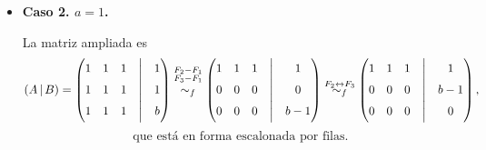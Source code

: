 \documentclass[a4paper,12pt]{article}
\begin{document}
\begin{ejercicio}[title=Ejercicio 31]
\begin{itemize}
Entonces, la solución ${X} = {A}^{-1} {B}$ es:

\[
\begin{pmatrix}
x\\
y\\
z
\end{pmatrix}
= \frac{1}{a^2+a-2}
\begin{pmatrix}
a+1 & -1 & -1\\
-1 & a+1 & -1\\
-1 & -1 & a+1
\end{pmatrix}
\begin{pmatrix}
1\\
1\\
b
\end{pmatrix}
\]

\[
= \frac{1}{a^2+a-2}
\begin{pmatrix}
(a+1) - 1 - b\\
-1 + (a+1) - b\\
-1 - 1 + b(a+1)
\end{pmatrix}
= \frac{1}{a^2+a-2}
\begin{pmatrix}
a-b\\
a-b\\
ab+b-2
\end{pmatrix}
=
\boxed{
\begin{pmatrix}
\dfrac{a-b}{a^2+a-2}\\[12pt]
\dfrac{a-b}{a^2+a-2}\\[12pt]
\dfrac{ab+b-2}{a^2+a-2}
\end{pmatrix}}
\]

\item \textbf{Caso 2. $a=1$.}

La matriz ampliada es
\[
(A\,|\,B)=
\begin{pmatrix}
1 & 1 & 1 &\Big|& 1\\
1 & 1 & 1 &\Big|& 1\\
1 & 1 & 1 &\Big|& b
\end{pmatrix}
\overset{\substack{F_2-F_1\\ F_3-F_1 \\{}}}{\sim_f}
\begin{pmatrix}
1 & 1 & 1 &\Big|& 1\\
0 & 0 & 0 &\Big|& 0\\
0 & 0 & 0 &\Big|& b-1
\end{pmatrix}
\overset{F_2 \leftrightarrow F_3 \\{}}{\sim_f}
\begin{pmatrix}
1 & 1 & 1 &\Big|& 1\\
0 & 0 & 0 &\Big|& b-1\\
0 & 0 & 0 &\Big|& 0
\end{pmatrix},
\]
\[
\text{que está en forma escalonada por filas.}
\]
\end{itemize}
\end{ejercicio}
\end{document}
